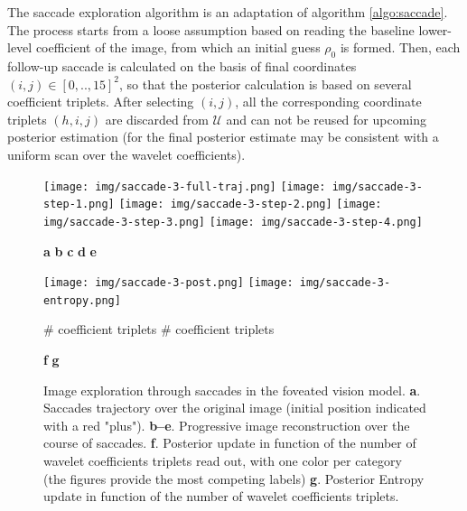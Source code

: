 \documentclass{article} %
\begin{document}
The saccade exploration algorithm is an adaptation of algorithm \ref{algo:saccade}. The process starts from a loose assumption based on reading the baseline lower-level coefficient of the image, from which an initial guess $\rho_0$ is formed. Then, each follow-up saccade is calculated on the basis of final coordinates $(i,j) \in [0,..,15]^2$, so that the posterior calculation is based on several coefficient triplets. After selecting $(i,j)$, all the corresponding coordinate triplets $(h,i,j)$ are discarded from $\mathcal{U}$ and can not be reused for upcoming posterior estimation (for the final posterior estimate may be consistent with a uniform scan over the wavelet coefficients). 

\begin{figure}[t!]
	\centerline{
		\texttt{[image: img/saccade-3-full-traj.png]} 
		\texttt{[image: img/saccade-3-step-1.png]} 
		\texttt{[image: img/saccade-3-step-2.png]} 
		\texttt{[image: img/saccade-3-step-3.png]} 
		\texttt{[image: img/saccade-3-step-4.png]}}
	\centerline{\textbf{a} \hspace{2.6cm} \textbf{b} \hspace{2.4cm} \textbf{c} \hspace{2.4cm} \textbf{d} \hspace{2.6cm} \textbf{e}}
	\centerline{\texttt{[image: img/saccade-3-post.png]} 
	\texttt{[image: img/saccade-3-entropy.png]} }
	\vspace{-.2cm}
	\centerline{\# coefficient triplets \hspace{2.9cm} \# coefficient triplets}
	\centerline{\textbf{f} \hspace{5.5cm} \textbf{g}}
	\caption{Image exploration through saccades in the foveated vision model. \textbf{a}. Saccades trajectory over the original image (initial position indicated with a red "plus"). \textbf{b--e}. Progressive image reconstruction over the course of saccades.  \textbf{f}. Posterior update in function of the number of wavelet coefficients triplets read out, with one color per category (the figures provide the most competing labels) \textbf{g}. Posterior Entropy update in function of the number of wavelet coefficients triplets.}\label{fig:foveated-saccades}
\end{figure}
\end{document}
